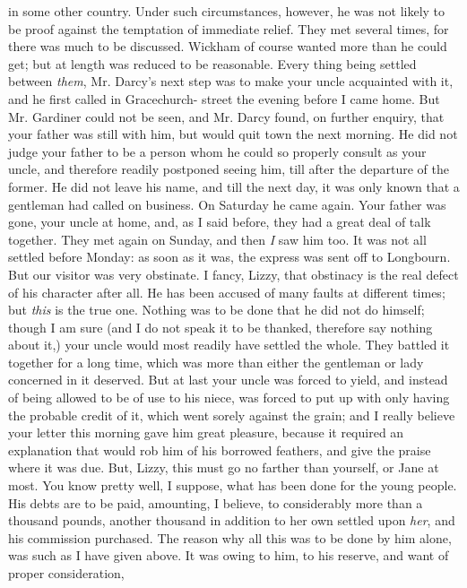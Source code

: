 \begin{letter}
in some other country. Under such circumstances,
however, he was not likely to be proof against the temptation
of immediate relief. They met several times, for
there was much to be discussed. Wickham of course
wanted more than he could get; but at length was
reduced to be reasonable. Every thing being settled
between \textit{them}, Mr. Darcy’s next step was to make your
uncle acquainted with it, and he first called in Gracechurch-%
street the evening before I came home. But Mr. Gardiner
could not be seen, and Mr. Darcy found, on further enquiry,
that your father was still with him, but would quit town
the next morning. He did not judge your father to be
a person whom he could so properly consult as your uncle,
and therefore readily postponed seeing him, till after the
departure of the former. He did not leave his name, and
till the next day, it was only known that a gentleman had
called on business. On Saturday he came again. Your
father was gone, your uncle at home, and, as I said before,
they had a great deal of talk together. They met again on
Sunday, and then \textit{I} saw him too. It was not all settled
before Monday: as soon as it was, the express was sent
off to Longbourn. But our visitor was very obstinate.
I fancy, Lizzy, that obstinacy is the real defect of his
character after all. He has been accused of many faults
at different times; but \textit{this} is the true one. Nothing was
to be done that he did not do himself; though I am
sure (and I do not speak it to be thanked, therefore say
nothing about it,) your uncle would most readily have
settled the whole. They battled it together for a long
time, which was more than either the gentleman or lady
concerned in it deserved. But at last your uncle was
forced to yield, and instead of being allowed to be of use
to his niece, was forced to put up with only having the
probable credit of it, which went sorely against the grain;
and I really believe your letter this morning gave him
great pleasure, because it required an explanation that
would rob him of his borrowed feathers, and give the
praise where it was due. But, Lizzy, this must go no
farther than yourself, or Jane at most. You know pretty
well, I suppose, what has been done for the young people.
His debts are to be paid, amounting, I believe, to considerably
more than a thousand pounds, another thousand in
addition to her own settled upon \textit{her}, and his commission
purchased. The reason why all this was to be done by
him alone, was such as I have given above. It was owing
to him, to his reserve, and want of proper consideration,

\end{letter}
